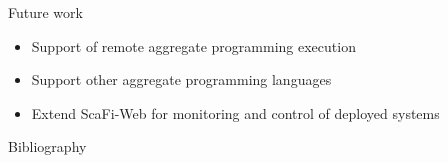 \documentclass[presentation]{beamer}
\newcommand{\scafiweb}{{\sc{}ScaFi-Web}}
\begin{document}
\begin{frame}{Future work}

\begin{itemize}
\item Support of remote aggregate programming execution
\item Support other aggregate programming languages
\item Extend \scafiweb{} for monitoring and control of deployed systems
\end{itemize}
\end{frame}

\begin{frame}[allowframebreaks]{Bibliography}
\def\bibfont{\footnotesize}
\printbibliography
\end{frame}
\end{document}
